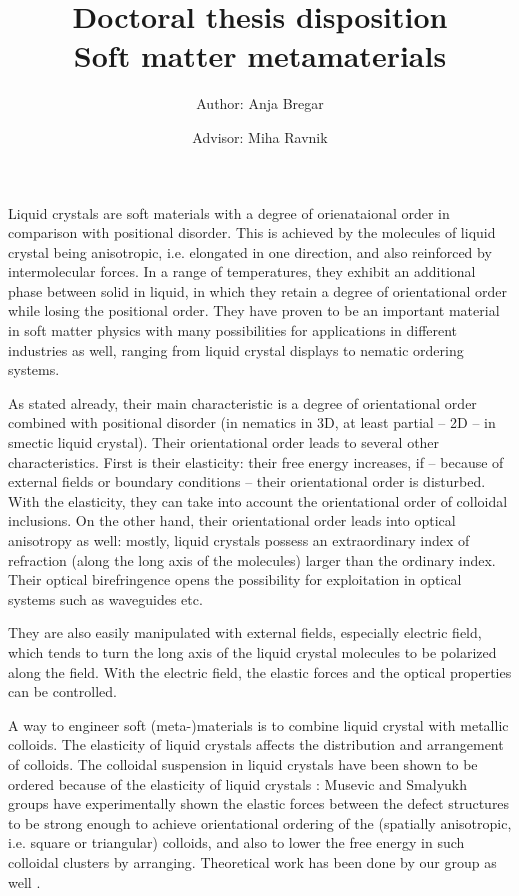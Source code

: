 \documentclass[a4paper,11pt]{article}
\title{\Large{Doctoral thesis disposition} \\ \LARGE{Soft matter metamaterials}}
\author{Author: Anja Bregar \and Advisor: Miha Ravnik}
\begin{document}
\onehalfspacing

\maketitle

% 
% 
% 
%



Liquid crystals are soft materials with a degree of orienataional order in comparison with positional disorder. 
This is achieved by the molecules of liquid crystal being anisotropic, i.e. elongated in one direction, and also reinforced by intermolecular forces.  
In a range of temperatures, they exhibit an additional phase between solid in liquid, in which they retain a degree of orientational order while losing the positional order. 
They have proven to be an important material in soft matter physics with many possibilities for applications in different industries as well, ranging from liquid crystal displays to nematic ordering systems. 

As stated already, their main characteristic is a degree of orientational order combined with positional disorder (in nematics in 3D, at least partial -- 2D -- in smectic liquid crystal). 
Their orientational order leads to several other characteristics. 
First is their elasticity: their free energy increases, if -- because of external fields or boundary conditions -- their orientational order is disturbed. 
With the elasticity, they can take into account the orientational order of colloidal inclusions. 
On the other hand, their orientational order leads into optical anisotropy as well: mostly, liquid crystals possess an extraordinary index of refraction (along the long axis of the molecules) larger than the ordinary index. 
Their optical birefringence opens the possibility for exploitation in optical systems such as waveguides etc. 

They are also easily manipulated with external fields, especially electric field, which tends to turn the long axis of the liquid crystal molecules to be polarized along the field. 
With the electric field, the elastic forces and the optical properties can be controlled. 

A way to engineer soft (meta-)materials is to combine liquid crystal with metallic colloids. 
The elasticity of liquid crystals affects the distribution and arrangement of colloids. 
The colloidal suspension in liquid crystals have been shown to be ordered because of the elasticity of liquid crystals \cite{1, 2, 3,}: 
Musevic and Smalyukh groups have experimentally shown the elastic forces between the defect structures to be strong enough to achieve orientational ordering of the (spatially anisotropic, i.e. square or triangular) colloids, and also to lower the free energy in such colloidal clusters by arranging. 
Theoretical work has been done by our group as well \cite{cc}. 
\end{document}
